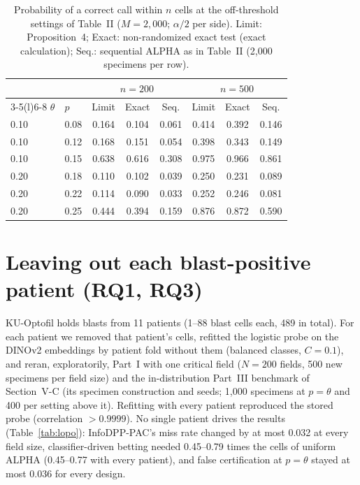 \documentclass[journal]{IEEEtran}
\begin{document}
\begin{table}[t]
\centering\footnotesize
\caption{Probability of a correct call within $n$ cells at the off-threshold settings of Table~II ($M=2{,}000$; $\alpha/2$ per side). Limit: Proposition~4; Exact: non-randomized exact test (exact calculation); Seq.: sequential ALPHA as in Table~II (2,000 specimens per row).}\label{tab:limit2}
\setlength{\tabcolsep}{3.5pt}
\begin{tabular}{@{}llcccccc@{}}
\toprule
 & & \multicolumn{3}{c}{$n=200$} & \multicolumn{3}{c}{$n=500$}\\
\cmidrule(lr){3-5}\cmidrule(l){6-8}
$\theta$ & $p$ & Limit & Exact & Seq. & Limit & Exact & Seq.\\
\midrule
0.10 & 0.08 & 0.164 & 0.104 & 0.061 & 0.414 & 0.392 & 0.146\\
0.10 & 0.12 & 0.168 & 0.151 & 0.054 & 0.398 & 0.343 & 0.149\\
0.10 & 0.15 & 0.638 & 0.616 & 0.308 & 0.975 & 0.966 & 0.861\\
0.20 & 0.18 & 0.110 & 0.102 & 0.039 & 0.250 & 0.231 & 0.089\\
0.20 & 0.22 & 0.114 & 0.090 & 0.033 & 0.252 & 0.246 & 0.081\\
0.20 & 0.25 & 0.444 & 0.394 & 0.159 & 0.876 & 0.872 & 0.590\\
\bottomrule
\end{tabular}
\end{table}

\section{Leaving out each blast-positive patient (RQ1, RQ3)}
KU-Optofil holds blasts from 11 patients (1--88 blast cells each, 489 in total). For each patient we removed that patient's cells, refitted the logistic probe on the DINOv2 embeddings by patient fold without them (balanced classes, $C=0.1$), and reran, exploratorily, Part~I with one critical field ($N=200$ fields, 500 new specimens per field size) and the in-distribution Part~III benchmark of Section~V-C (its specimen construction and seeds; 1,000 specimens at $p=\theta$ and 400 per setting above it). Refitting with every patient reproduced the stored probe (correlation $>0.9999$). No single patient drives the results (Table~\ref{tab:lopo}): InfoDPP-PAC's miss rate changed by at most 0.032 at every field size, classifier-driven betting needed 0.45--0.79 times the cells of uniform ALPHA (0.45--0.77 with every patient), and false certification at $p=\theta$ stayed at most 0.036 for every design.
\end{document}
